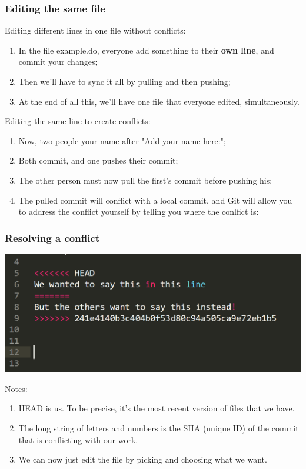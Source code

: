 \documentclass{beamer}
\begin{document}
\begin{frame}
	\frametitle{Editing the same file}
	Editing different lines in one file without conflicts:
	\begin{enumerate}
		\item<2-> In the file example.do, everyone add something to their \textbf{own line}, and commit your changes;
		\item<2-> Then we'll have to sync it all by pulling and then pushing;
		\item<2-> At the end of all this, we'll have one file that everyone edited, simultaneously.
	\end{enumerate}
	Editing the same line to create conflicts:
	\begin{enumerate}
		\item<3-> Now, two people your name after "Add your name here:";
		\item<3-> Both commit, and one pushes their commit;
		\item<4-> The other person must now pull the first's commit before pushing his;
		\item<4-> The pulled commit will conflict with a local commit, and Git will allow you to address the conflict yourself by telling you where the conlfict is:
	\end{enumerate}
	
\end{frame}

\begin{frame}
	\frametitle{Resolving a conflict}
	\hfill\includegraphics[width=0.8\linewidth]{figures/conflict.png}\hfill\strut
	Notes:
	\begin{enumerate}
		\item HEAD is us. To be precise, it's the most recent version of files that we have.
		\item The long string of letters and numbers is the SHA (unique ID) of the commit that is conflicting with our work.
		\item We can now just edit the file by picking and choosing what we want.
	\end{enumerate}
\end{frame}
\end{document}
